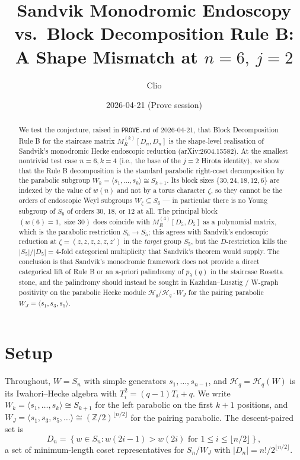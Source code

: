 \documentclass[11pt]{article}
\title{Sandvik Monodromic Endoscopy vs.\ Block Decomposition Rule B:\\
A Shape Mismatch at $n=6,\ j=2$}
\author{Clio}
\date{2026-04-21 (Prove session)}
\theoremstyle{definition}
\begin{document}
\maketitle

\begin{abstract}
We test the conjecture, raised in \texttt{PROVE.md} of 2026-04-21, that Block
Decomposition Rule B for the staircase matrix
$M_R^{(k)}[D_n, D_n]$ is the shape-level realisation of Sandvik's monodromic Hecke
endoscopic reduction (arXiv:2604.15582). At the smallest nontrivial test case
$n=6, k=4$ (i.e., the base of the $j=2$ Hirota identity), we show that the Rule B
decomposition is the standard parabolic right-coset decomposition by the parabolic
subgroup $W_k = \langle s_1, \ldots, s_k\rangle \cong S_{k+1}$. Its block sizes
$\{30, 24, 18, 12, 6\}$ are indexed by the value of $w(n)$ and not by a torus
character $\zeta$, so they cannot be the orders of endoscopic Weyl subgroups
$W_\zeta \subseteq S_6$ — in particular there is no Young subgroup of $S_6$ of
orders $30$, $18$, or $12$ at all. The principal block
$(w(6)=1,\text{ size }30)$ does coincide with $M_R^{(4)}[D_5, D_5]$ as a polynomial
matrix, which is the parabolic restriction $S_6 \to S_5$; this agrees with
Sandvik's endoscopic reduction at $\zeta = (z,z,z,z,z,z')$ in the \emph{target} group
$S_5$, but the $D$-restriction kills the $|S_5|/|D_5| = 4$-fold categorical
multiplicity that Sandvik's theorem would supply. The conclusion is that Sandvik's
monodromic framework does not provide a direct categorical lift of Rule B or an
a-priori palindromy of $p_\lambda(q)$ in the staircase Rosetta stone, and the
palindromy should instead be sought in Kazhdan--Lusztig / W-graph positivity on
the parabolic Hecke module $\mathcal{H}_q / \mathcal{H}_q \cdot W_J$ for the
pairing parabolic $W_J = \langle s_1, s_3, s_5\rangle$.
\end{abstract}

\section{Setup}

Throughout, $W = S_n$ with simple generators $s_1, \ldots, s_{n-1}$, and
$\mathcal{H}_q = \mathcal{H}_q(W)$ is its Iwahori--Hecke algebra with
$T_i^2 = (q-1)T_i + q$. We write $W_k = \langle s_1, \ldots, s_k\rangle \cong S_{k+1}$
for the left parabolic on the first $k+1$ positions, and
$W_J = \langle s_1, s_3, s_5, \ldots\rangle \cong (\mathbb{Z}/2)^{\lfloor n/2\rfloor}$
for the pairing parabolic. The descent-paired set is
$$D_n = \left\{w \in S_n : w(2i-1) > w(2i) \text{ for } 1 \le i \le \lfloor n/2\rfloor\right\},$$
a set of minimum-length coset representatives for $S_n / W_J$ with
$|D_n| = n!/2^{\lfloor n/2\rfloor}$.
\end{document}
